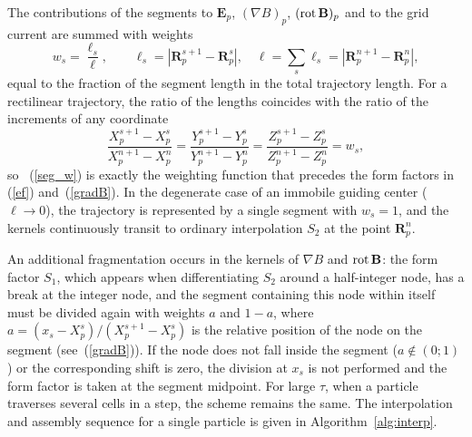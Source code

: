 \documentclass[final,3p]{elsarticle}
\newcommand{\rot}{\mbox{\rm{rot\,}}}
\begin{document}
The contributions of the segments to $\mathbf{E}_p$, $(\nabla B)_p$, $(\rot\mathbf{B})_p$ and to the grid current are summed with weights
\begin{equation}\label{seg_w}
	w_s=\frac{\ell_s}{\ell},\qquad \ell_s=\left|\mathbf{R}_p^{s+1}-\mathbf{R}_p^{s}\right|,\quad \ell=\sum\limits_{s}\ell_s=\left|\mathbf{R}_p^{n+1}-\mathbf{R}_p^{n}\right|,
\end{equation}
equal to the fraction of the segment length in the total trajectory length. For a rectilinear trajectory, the ratio of the lengths coincides with the ratio of the increments of any coordinate
\begin{equation}
	\frac{X_p^{s+1}-X_p^s}{X_p^{n+1}-X_p^n}=\frac{Y_p^{s+1}-Y_p^s}{Y_p^{n+1}-Y_p^n}=\frac{Z_p^{s+1}-Z_p^s}{Z_p^{n+1}-Z_p^n}=w_s,
\end{equation}
so ~(\ref{seg_w}) is exactly the weighting function that precedes the form factors in (\ref{ef}) and~(\ref{gradB}). In the degenerate case of an immobile  guiding center ($\ell\to0$), the trajectory is represented by a single segment with $w_s=1$, and the kernels continuously transit to ordinary interpolation $S_2$ at the point $\mathbf{R}_p^{n}$.

An additional fragmentation occurs in the kernels of $\nabla B$ and $\rot\mathbf{B}$: the form factor $S_1$, which appears when differentiating $S_2$ around a half-integer node, has a break at the integer node, and the segment containing this node within itself must be divided again with weights $a$ and $1-a$, where $a=(x_s-X_p^{s})/(X_p^{s+1}-X_p^{s})$ is the relative position of the node on the segment (see~(\ref{gradB})). If the node does not fall inside the segment ($a\notin(0;1)$) or the corresponding shift is zero, the division at $x_s$ is not performed and the form factor is taken at the segment midpoint. For large $\tau$, when a particle traverses several cells in a step, the scheme remains the same. The interpolation and assembly sequence for a single particle is given in Algorithm~\ref{alg:interp}.
\end{document}

